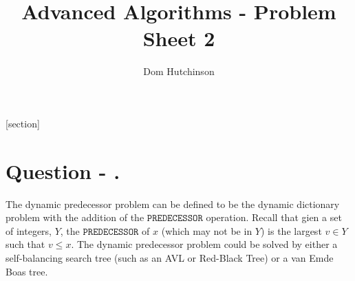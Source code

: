 \documentclass[11pt,a4paper]{article}
\begin{document}
\pagestyle{fancy}
\setlength\parindent{0pt}
\allowdisplaybreaks

\renewcommand{\headrulewidth}{0pt}

\title{Advanced Algorithms - Problem Sheet 2}
\author{Dom Hutchinson}
\maketitle

\fancyhead[R]{\today}

[section]

\newcommand{\dotprod}[0]{\boldsymbol{\cdot}}
\newcommand{\cosech}[0]{\mathrm{cosech}\ }
\newcommand{\cosec}[0]{\mathrm{cosec}\ }
\newcommand{\sech}[0]{\mathrm{sech}\ }
\newcommand{\prob}[0]{\mathbb{P}}
\newcommand{\nats}[0]{\mathbb{N}}
\newcommand{\cov}[0]{\mathrm{cov}}
\newcommand{\var}[0]{\mathrm{var}}
\newcommand{\expect}[0]{\mathbb{E}}
\newcommand{\reals}[0]{\mathbb{R}}
\newcommand{\integers}[0]{\mathbb{Z}}
\newcommand{\indicator}[0]{\mathds{1}}
\newcommand{\nb}[0]{\textit{N.B.} }
\newcommand{\ie}[0]{\textit{i.e.} }
\newcommand{\eg}[0]{\textit{e.g.} }
\newcommand{\iid}[0]{\overset{\text{iid}}{\sim} }
\newcommand{\x}[0]{\textbf{x} }
\newcommand{\X}[0]{\textbf{X} }
\newcommand{\Mod}[0]{\text{ mod }}
\newcommand{\proved}[0]{$\hfill\square$}

\newcommand{\qpart}[0]{\stepcounter{qpart} \textbf{Question \arabic{section} \alph{qpart})\\}}
\newcommand{\qpartnb}[0]{\stepcounter{qpart} \textbf{Question \arabic{section} \alph{qpart})} - }
\newcommand{\ans}[0]{ \textbf{Answer \arabic{section}\\}}
\newcommand{\ansnb}[0]{ \textbf{Answer \arabic{section}}}
\newcommand{\apart}[0]{ \textbf{Answer \arabic{section} \alph{qpart})\\}}
\newcommand{\apartnb}[0]{\textbf{Answer \arabic{section} \alph{qpart})}}
\newcommand{\question}[0]{\section*{Question - .}}

\question
The dynamic predecessor problem can be defined to be the dynamic dictionary problem with the addition of the $\mathtt{PREDECESSOR}$ operation. Recall that gien a set of integers, $Y$, the $\mathtt{PREDECESSOR}$ of $x$ (which may not be in $Y$) is the largest $v\in Y$ such that $v\leq x$. The dynamic predecessor problem could be solved by either a self-balancing search tree (such as an AVL or Red-Black Tree) or a van Emde Boas tree.\\
\end{document}
